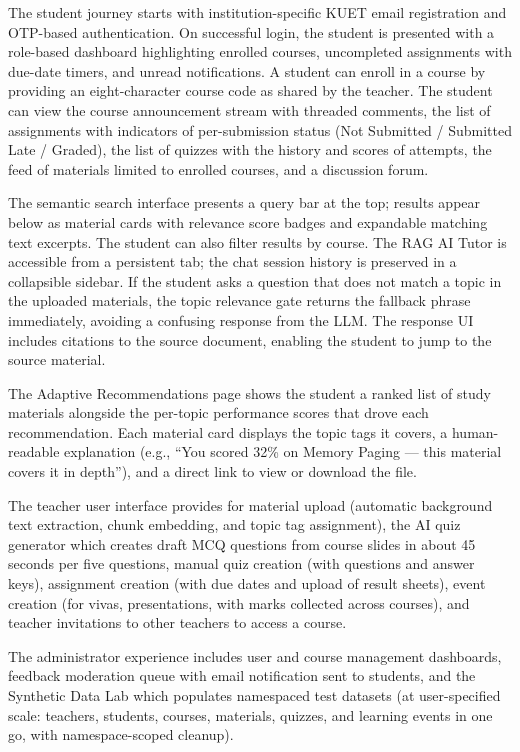 \documentclass[12pt,a4paper]{report}
\begin{document}
The student journey starts with institution-specific KUET email registration and OTP-based authentication. On successful login, the student is presented with a role-based dashboard highlighting enrolled courses, uncompleted assignments with due-date timers, and unread notifications. A student can enroll in a course by providing an eight-character course code as shared by the teacher. The student can view the course announcement stream with threaded comments, the list of assignments with indicators of per-submission status (Not Submitted / Submitted Late / Graded), the list of quizzes with the history and scores of attempts, the feed of materials limited to enrolled courses, and a discussion forum.

The semantic search interface presents a query bar at the top; results appear below as material cards with relevance score badges and expandable matching text excerpts. The student can also filter results by course. The RAG AI Tutor is accessible from a persistent tab; the chat session history is preserved in a collapsible sidebar. If the student asks a question that does not match a topic in the uploaded materials, the topic relevance gate returns the fallback phrase immediately, avoiding a confusing response from the LLM. The response UI includes citations to the source document, enabling the student to jump to the source material.

The Adaptive Recommendations page shows the student a ranked list of study materials alongside the per-topic performance scores that drove each recommendation. Each material card displays the topic tags it covers, a human-readable explanation (e.g., ``You scored 32\% on Memory Paging --- this material covers it in depth''), and a direct link to view or download the file.

The teacher user interface provides for material upload (automatic background text extraction, chunk embedding, and topic tag assignment), the AI quiz generator which creates draft MCQ questions from course slides in about 45 seconds per five questions, manual quiz creation (with questions and answer keys), assignment creation (with due dates and upload of result sheets), event creation (for vivas, presentations, with marks collected across courses), and teacher invitations to other teachers to access a course.

The administrator experience includes user and course management dashboards, feedback moderation queue with email notification sent to students, and the Synthetic Data Lab which populates namespaced test datasets (at user-specified scale: teachers, students, courses, materials, quizzes, and learning events in one go, with namespace-scoped cleanup).
\end{document}

